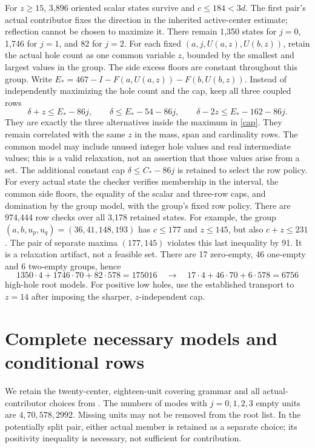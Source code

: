 \documentclass[11pt,a4paper]{article}
\begin{document}
For $z\ge15$, 3,896 oriented scalar states survive and $c\le184<3d$.
The first pair's actual contributor fixes the direction in the inherited
active-center estimate; reflection cannot be chosen to maximize it.
There remain 1,350 states for $j=0$, 1,746 for $j=1$, and 82 for $j=2$.
For each fixed $(a,j,U(a,z),U(b,z))$, retain the actual hole count as
one common variable $z$, bounded by the smallest and largest values in
the group. The side excess floors are constant throughout this group.
Write $E_*=467-I-F(a,U(a,z))-F(b,U(b,z))$. Instead of independently
maximizing the hole count and the cap, keep all three coupled rows
\[
 \delta+z\le E_*-86j,\qquad
 \delta\le E_*-54-86j,\qquad
 \delta-2z\le E_*-162-86j.
\]
They are exactly the three alternatives inside the maximum in
\eqref{cap}. They remain correlated with the same $z$ in the mass,
span and cardinality rows. The common model may include unused integer
hole values and real intermediate values; this is a valid relaxation,
not an assertion that those values arise from a set. The additional
constant cap $\delta\le C_*-86j$ is retained to select the row policy.
For every actual state the checker verifies membership in the interval,
the common side floors, the equality of the scalar and three-row caps,
and domination by the group model, with the group's fixed row policy.
There are 974,444 row checks over all 3,178 retained states.
For example, the group $(a,b,u_p,u_q)=(36,41,148,193)$ has
$c\le177$ and $z\le145$, but also $c+z\le231$.
The pair of separate maxima $(177,145)$ violates this last inequality
by 91. It is a relaxation artifact, not a feasible set.
There are 17 zero-empty, 46 one-empty and 6 two-empty groups, hence
\[
 1350\cdot4+1746\cdot70+82\cdot578=175016
 \quad\longrightarrow\quad17\cdot4+46\cdot70+6\cdot578=6756
\]
high-hole root models. For positive low holes, use the established
transport to $z=14$ after imposing the sharper, $z$-independent cap.

\section{Complete necessary models and conditional rows}
We retain the twenty-center, eighteen-unit covering grammar and all
actual-contributor choices from \cite{overlap,previous}. The numbers of
modes with $j=0,1,2,3$ empty units are $4,70,578,2992$.
Missing units may not be removed from the root list. In the potentially
split pair, either actual member is retained as a separate choice;
its positivity inequality is necessary, not sufficient for contribution.
\end{document}
